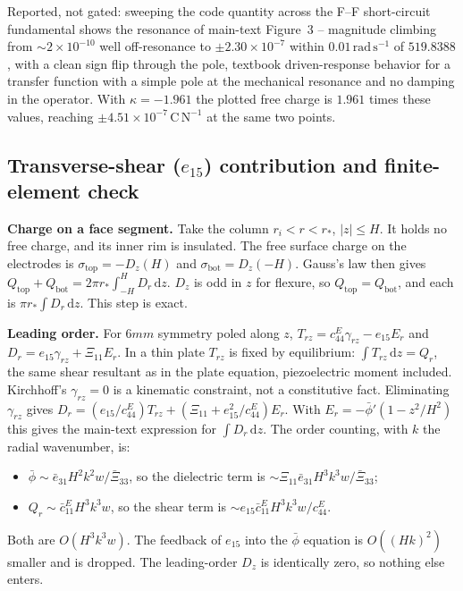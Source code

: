 \documentclass[11pt]{article}
\newcommand{\eebar}{\bar{e}_{31}}
\newcommand{\Xibar}{\bar{\Xi}_{33}}
\newcommand{\cbar}{\bar{c}_{11}^{E}}
\begin{document}
Reported, not gated: sweeping the code quantity across the F--F
short-circuit fundamental shows the resonance of main-text Figure~3 --
magnitude climbing from $\sim2\times10^{-10}$ well off-resonance to
$\pm2.30\times10^{-7}$ within $0.01\,\mathrm{rad\,s^{-1}}$ of
$519.8388$, with a clean sign flip through the pole, textbook
driven-response behavior for a transfer function with a simple pole at
the mechanical resonance and no damping in the operator. With
$\kappa=-1.961$ the plotted free charge is $1.961$ times these values,
reaching $\pm4.51\times10^{-7}\,\mathrm{C\,N^{-1}}$ at the same two
points.

\subsection{Transverse-shear ($e_{15}$) contribution and finite-element check}
\label{sec:s7e15}
\textbf{Charge on a face segment.} Take the column
$r_i<r<r_*$, $\lvert z\rvert\le H$. It holds no free charge, and its inner
rim is insulated. The free surface charge on the electrodes is
$\sigma_{\mathrm{top}}=-D_z(H)$ and $\sigma_{\mathrm{bot}}=D_z(-H)$. Gauss's
law then gives
$Q_{\mathrm{top}}+Q_{\mathrm{bot}}=2\pi r_*\int_{-H}^{H}D_r\,\mathrm dz$.
$D_z$ is odd in $z$ for flexure, so $Q_{\mathrm{top}}=Q_{\mathrm{bot}}$, and
each is $\pi r_*\int D_r\,\mathrm dz$. This step is exact.

\textbf{Leading order.} For $6mm$ symmetry poled along $z$,
$T_{rz}=c_{44}^E\gamma_{rz}-e_{15}E_r$ and
$D_r=e_{15}\gamma_{rz}+\Xi_{11}E_r$. In a thin plate $T_{rz}$ is fixed by
equilibrium: $\int T_{rz}\,\mathrm dz=Q_r$, the same shear resultant as in
the plate equation, piezoelectric moment included. Kirchhoff's
$\gamma_{rz}=0$ is a kinematic constraint, not a constitutive fact.
Eliminating $\gamma_{rz}$ gives
$D_r=(e_{15}/c_{44}^E)T_{rz}+(\Xi_{11}+e_{15}^2/c_{44}^E)E_r$. With
$E_r=-\bar\phi'(1-z^2/H^2)$ this gives the main-text expression for $\int D_r\,\mathrm dz$. The order
counting, with $k$ the radial wavenumber, is:
\begin{itemize}
\item $\bar\phi\sim\eebar H^2k^2w/\Xibar$, so the dielectric term is
$\sim\Xi_{11}\eebar H^3k^3w/\Xibar$;
\item $Q_r\sim\cbar H^3k^3w$, so the shear term is
$\sim e_{15}\cbar H^3k^3w/c_{44}^E$.
\end{itemize}
Both are $O(H^3k^3w)$. The feedback of $e_{15}$ into the $\bar\phi$
equation is $O((Hk)^2)$ smaller and is dropped. The leading-order $D_z$ is
identically zero, so nothing else enters.
\end{document}
